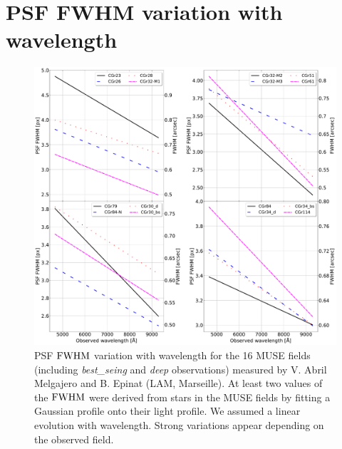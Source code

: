 \clearpage

\section{PSF FWHM variation with wavelength}

\begin{figure}[hbtp]
	\centering
	\includegraphics[width=\linewidth]{../Plots/FWHM_variation_with_lambda.pdf}
	\caption[PSF FWHM variation with wavelength.]{PSF $\rm{FWHM}$ variation with wavelength for the 16 MUSE fields (including \textit{best\_seing} and \textit{deep} observations) measured by V. Abril Melgajero and B. Epinat (LAM, Marseille). At least two values of the $\rm{FWHM}$ were derived from stars in the MUSE fields by fitting a Gaussian profile onto their light profile. We assumed a linear evolution with wavelength. Strong variations appear depending on the observed field.}
	\label{fig:FWHM_var_lambda}
\end{figure}
